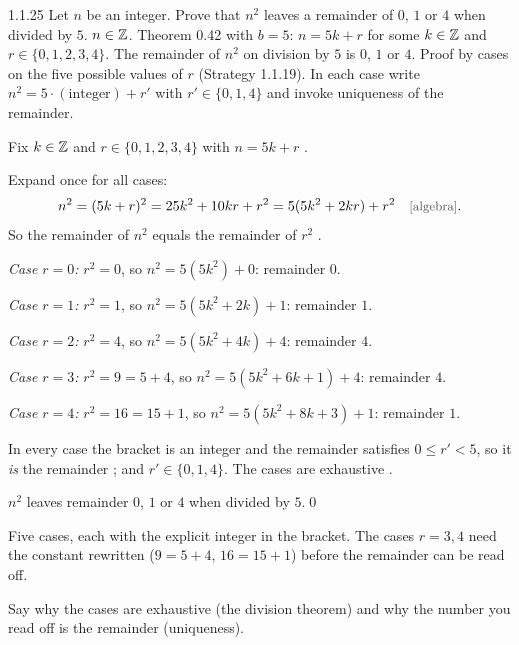 \begin{bookex}[essential]{1.1.25}
Let $n$ be an integer. Prove that $n^2$ leaves a remainder of $0$, $1$ or $4$ when divided by $5$.
\solution
\given $n\in\mathbb{Z}$. Theorem 0.42 with $b=5$: $n=5k+r$ for some $k\in\mathbb{Z}$ and $r\in\{0,1,2,3,4\}$.
\goal The remainder of $n^2$ on division by $5$ is $0$, $1$ or $4$. 
\plan Proof by cases on the five possible values of $r$ (Strategy 1.1.19). In each case write $n^2=5\cdot(\text{integer})+r'$ with $r'\in\{0,1,4\}$ and invoke uniqueness of the remainder.
\begin{steps}
\item Fix $k\in\mathbb{Z}$ and $r\in\{0,1,2,3,4\}$ with $n=5k+r$ .
\item Expand once for all cases:
\[
n^2=(5k+r)^2=25k^2+10kr+r^2=5(5k^2+2kr)+r^2 \why{algebra}.
\]
So the remainder of $n^2$ equals the remainder of $r^2$ .
\item \emph{Case $r=0$:} $r^2=0$, so $n^2=5(5k^2)+0$: remainder $0$.
\item \emph{Case $r=1$:} $r^2=1$, so $n^2=5(5k^2+2k)+1$: remainder $1$.
\item \emph{Case $r=2$:} $r^2=4$, so $n^2=5(5k^2+4k)+4$: remainder $4$.
\item \emph{Case $r=3$:} $r^2=9=5+4$, so $n^2=5(5k^2+6k+1)+4$: remainder $4$.
\item \emph{Case $r=4$:} $r^2=16=15+1$, so $n^2=5(5k^2+8k+3)+1$: remainder $1$.
\item In every case the bracket is an integer and the remainder satisfies $0\le r'<5$, so it \emph{is} the remainder ; and $r'\in\{0,1,4\}$. The cases are exhaustive .
\end{steps}
\conclusion $n^2$ leaves remainder $0$, $1$ or $4$ when divided by $5$.\qed
\begin{compare}
\item Five cases, each with the explicit integer in the bracket. The cases $r=3,4$ need the constant rewritten ($9=5+4$, $16=15+1$) before the remainder can be read off.
\item Say why the cases are exhaustive (the division theorem) and why the number you read off is the remainder (uniqueness).
\end{compare}
\end{bookex}

